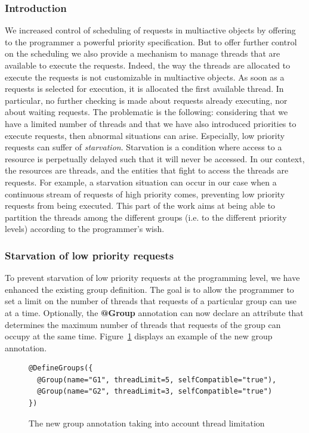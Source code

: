 \documentclass[11pt]{report}
\begin{document}
\subsubsection{Introduction}
We increased control of scheduling of requests in multiactive objects by offering to the programmer a powerful priority specification. But to offer further control on the scheduling we also provide a mechanism to manage threads that are available to execute the requests. Indeed, the way the threads are allocated to execute the requests is not customizable in multiactive objects. As soon as a requests is selected for execution, it is allocated the first available thread. In particular, no further checking is made about requests already executing, nor about waiting requests. The problematic is the following: considering that we have a limited number of threads and that we have also introduced priorities to execute requests, then abnormal situations can arise. Especially, low priority requests can suffer of \emph{starvation}. Starvation is a condition where access to a resource is perpetually delayed such that it will never be accessed. In our context, the resources are threads, and the entities that fight to access the threads are requests. For example, a starvation situation can occur in our case when a continuous stream of requests of high priority comes, preventing low priority requests from being executed. 
This part of the work aims at being able to partition the threads among the different groups (i.e. to the different priority levels) according to the programmer's wish. 

\subsubsection{Starvation of low priority requests}
To prevent starvation of low priority requests at the programming level, we have enhanced the existing group definition. The goal is to allow the programmer to set a limit on the number of threads that requests of a particular group can use at a time. Optionally, the \textbf{@Group} annotation can now declare an attribute that determines the maximum number of threads that requests of the group can occupy at the same time. Figure~\ref{fig:new_groups} displays an example of the new group annotation.

\begin{figure}[!ht]
	\lstset{language=java, numbers=left, numberstyle=\tiny, stepnumber=1, numbersep=5pt, basicstyle=\footnotesize}
	\begin{lstlisting}[frame=single]
@DefineGroups({
  @Group(name="G1", threadLimit=5, selfCompatible="true"),
  @Group(name="G2", threadLimit=3, selfCompatible="true")
})
 	\end{lstlisting}
\caption{The new group annotation taking into account thread limitation}
\label{fig:new_groups}
\end{figure}
\end{document}
